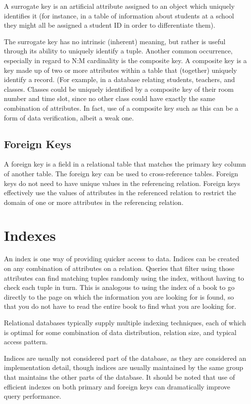 \documentclass[10pt,twoside,english]{_support/latex/sbabook/sbabook}
\begin{document}
A surrogate key is an artificial attribute assigned to an object which uniquely
identifies it (for instance, in a table of information about students at a
school they might all be assigned a student ID in order to differentiate them).

The surrogate key has no intrinsic (inherent) meaning, but rather is useful
through its ability to uniquely identify a tuple. Another common occurrence,
especially in regard to N:M cardinality is the composite key. A composite key is
a key made up of two or more attributes within a table that (together) uniquely
identify a record. (For example, in a database relating students, teachers, and
classes. Classes could be uniquely identified by a composite key of their room
number and time slot, since no other class could have exactly the same
combination of attributes. In fact, use of a composite key such as this can be a
form of data verification, albeit a weak one.
\subsection{Foreign Keys}
A foreign key is a field in a relational table that matches
the primary key column of another table. The foreign key can be used to
cross-reference tables. Foreign keys do not need to have unique values in the
referencing relation. Foreign keys effectively use the values of attributes in
the referenced relation to restrict the domain of one or more attributes in the
referencing relation.
\section{Indexes}
An index is one way of providing quicker access to data. Indices can be created
on any combination of attributes on a relation. Queries that filter using those
attributes can find matching tuples randomly using the index, without having to
check each tuple in turn. This is analogous to using the index of a book to go
directly to the page on which the information you are looking for is found, so
that you do not have to read the entire book to find what you are looking for.

Relational databases typically supply multiple indexing techniques, each of
which is optimal for some combination of data distribution, relation size, and
typical access pattern.

Indices are usually not considered part of the database, as they are considered
an implementation detail, though indices are usually maintained by the same
group that maintains the other parts of the database. It should be noted that
use of efficient indexes on both primary and foreign keys can dramatically
improve query performance.
\end{document}
